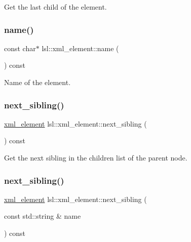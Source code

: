 Get the last child of the element. 

\mbox{\label{classlsl_1_1xml__element_a2e449e85b7e763b1d0db4bb19d2eb7c2}} 
\subsubsection{\texorpdfstring{name()}{name()}}
{\footnotesize\ttfamily const char$\ast$ lsl\+::xml\+\_\+element\+::name (\begin{DoxyParamCaption}{ }\end{DoxyParamCaption}) const\hspace{0.3cm}{\ttfamily [inline]}}



Name of the element. 

\mbox{\label{classlsl_1_1xml__element_a9637215f616b660789696e452b0e0591}} 
\subsubsection{\texorpdfstring{next\+\_\+sibling()}{next\_sibling()}\hspace{0.1cm}{\footnotesize\ttfamily [1/2]}}
{\footnotesize\ttfamily \hyperlink{classlsl_1_1xml__element}{xml\+\_\+element} lsl\+::xml\+\_\+element\+::next\+\_\+sibling (\begin{DoxyParamCaption}{ }\end{DoxyParamCaption}) const\hspace{0.3cm}{\ttfamily [inline]}}



Get the next sibling in the children list of the parent node. 

\mbox{\label{classlsl_1_1xml__element_a100590d2a9822261a3f0b0ed7810134d}} 
\subsubsection{\texorpdfstring{next\+\_\+sibling()}{next\_sibling()}\hspace{0.1cm}{\footnotesize\ttfamily [2/2]}}
{\footnotesize\ttfamily \hyperlink{classlsl_1_1xml__element}{xml\+\_\+element} lsl\+::xml\+\_\+element\+::next\+\_\+sibling (\begin{DoxyParamCaption}\item[{const std\+::string \&}]{name }\end{DoxyParamCaption}) const\hspace{0.3cm}{\ttfamily [inline]}}



